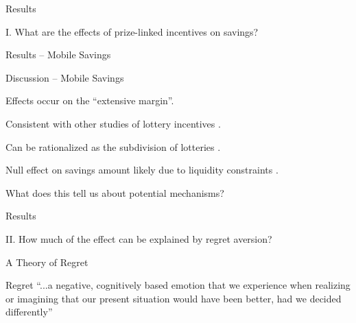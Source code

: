 \documentclass[aspectratio=169]{beamer}
\newenvironment{wideitemize}{\itemize\addtolength{\itemsep}{10pt}}{\enditemize}
\begin{document}
\begin{frame}{Results}
	
	\centering \large I. What are the effects of prize-linked incentives on savings?

\end{frame}

\begin{frame}{Results -- Mobile Savings}

	


\end{frame}

\begin{frame}{Discussion -- Mobile Savings}

	\begin{wideitemize}
		\item Effects occur on the ``extensive margin''.
		\begin{wideitemize}
			\item Consistent with other studies of lottery incentives \parencite{brune_effect_2015,gertler_long-term_2017}.
			\item Can be rationalized as the subdivision of lotteries \parencite{samuelson_risk_1963}.
		\end{wideitemize}
		\item Null effect on savings amount likely due to liquidity constraints \parencite{loibl_testing_2016}.
		\item What does this tell us about potential mechanisms?
	\end{wideitemize}

\end{frame}

\begin{frame}{Results}
	
	\centering \large II. How much of the effect can be explained by regret aversion?

\end{frame}

\begin{frame}{A Theory of Regret}

	\begin{block}{Regret \parencite{zeelenberg_consequences_2004}}
	 ``...a negative, cognitively based emotion that we experience when realizing or imagining that our present situation would have been better, had we decided differently''
	\end{block}

\end{frame}
\end{document}
